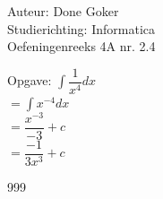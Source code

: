 \documentclass[a4paper]{article}
\begin{document}
  
\noindent \large Auteur: Done Goker \\
\noindent \large Studierichting: Informatica\\
\noindent \large Oefeningenreeks 4A nr. 2.4\\

\medskip

\normalsize

Opgave:
$\displaystyle\int \dfrac{1}{x^4}dx$ \\

$= \displaystyle\int x^{-4}dx$ \\

$= \dfrac{x^{-3}}{-3} + c$ \\

$= \dfrac{-1}{3x^3} + c$


\begin{thebibliography}{999}
\end{thebibliography}
\end{document}

